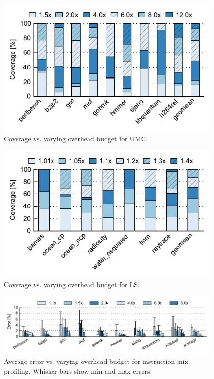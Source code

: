 \begin{figure}
  \begin{center}
    \includegraphics{monitoring_dift_drop/data/umc_sweep.pdf}
    \caption{Coverage vs. varying overhead budget for UMC.}
    \label{fig:monitoring_dift_drop.evaluation.umc_sweep}
  \end{center}
\end{figure}

\begin{figure}
  \begin{center}
    \includegraphics{monitoring_dift_drop/data/ls_sweep.pdf}
    \caption{Coverage vs. varying overhead budget for LS.}
    \label{fig:monitoring_dift_drop.evaluation.ls_sweep}
  \end{center}
\end{figure}

\begin{figure}
  \begin{center}
    \includegraphics{monitoring_dift_drop/data/imp_sweep.pdf}
    \caption{Average error vs. varying overhead budget for instruction-mix
    profiling. Whisker bars show min and max errors.}
    \label{fig:monitoring_dift_drop.evaluation.imp_sweep}
  \end{center}
\end{figure}

